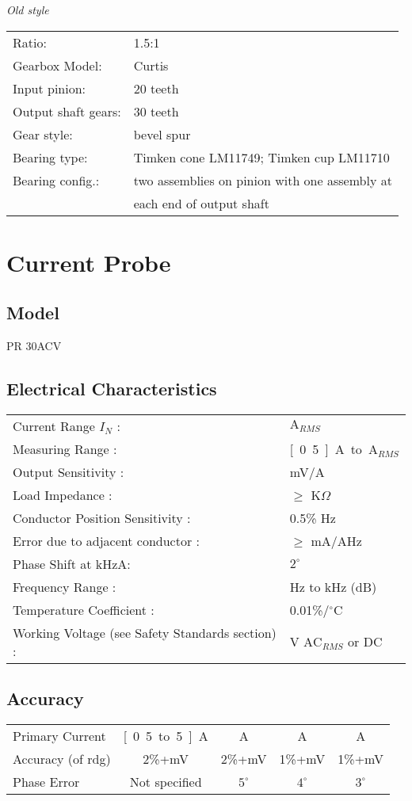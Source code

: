\documentclass[a4paper,11pt]{report}
\begin{document}
\textsl{Old style} \\

\begin{tabular}{ll}
Ratio: & 1.5:1\\
Gearbox Model: & Curtis\\
Input pinion: & 20 teeth\\
Output shaft gears: & 30 teeth\\
Gear style: & bevel spur\\
Bearing type: & Timken cone LM11749; Timken cup LM11710\\
Bearing config.: & two assemblies on pinion with one assembly at \\
	& each end of output shaft
\end{tabular}

\section{Current Probe}
\subsection*{Model} PR 30ACV

\subsection*{Electrical Characteristics}
\begin{tabular}{ll}
Current Range $I_{N}$ : &  \unit[30]{$\textrm{A}_{RMS}$} \\
Measuring Range : &  \unit[0.5]{A} to \unit[80]{$\textrm{A}_{RMS}$} \\
Output Sensitivity : &  \unit[100]{mV/A} \\
Load Impedance : &  $\geq$ \unit[100]{K$\Omega$} \\
Conductor Position Sensitivity : &  0.5\% \@\unit[50]{Hz} \\
Error due to adjacent conductor : &  $\geq$ \unit[15]{mA/A}\@\unit[50]{Hz} \\
Phase Shift at \unit[2]{kHz}\@\unit[10]{A}: & $2^{\circ}$ \\
Frequency Range : &  \unit[30]{Hz} to \unit[10]{kHz} (\unit[-3]{dB}) \\
Temperature Coefficient : &  0.01\%/$^{\circ}$C \\
Working Voltage (see Safety Standards section) : &  \unit[600]{V} $\textrm{AC}_{RMS}$ or DC
\end{tabular}

\subsection*{Accuracy}
\begin{tabular}{lcccc}
Primary Current & \unit[0.5 to 5]{A} & \unit[5 to 10]{A} & \unit[10 to 30]{A} & \unit[30 to 80]{A} \\
Accuracy (of rdg) & 2\%+\unit[25]{mV} & 2\%+\unit[5]{mV} & 1\%+\unit[5]{mV} & 1\%+\unit[5]{mV} \\
Phase Error & Not specified & $5^{\circ}$ & $4^{\circ}$ & $3^{\circ}$
\end{tabular}
\end{document}

